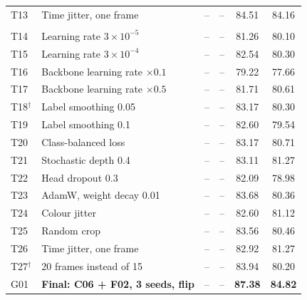 {\begin{longtable}{@{}llcccc@{}}
T13 & Time jitter, one frame & -- & -- & 84.51 & 84.16 \\
\addlinespace
\multicolumn{6}{@{}l}{\textit{Tuning F02, one change each}} \\
T14 & Learning rate $3\times10^{-5}$ & -- & -- & 81.26 & 80.10 \\
T15 & Learning rate $3\times10^{-4}$ & -- & -- & 82.54 & 80.30 \\
T16 & Backbone learning rate $\times0.1$ & -- & -- & 79.22 & 77.66 \\
T17 & Backbone learning rate $\times0.5$ & -- & -- & 81.71 & 80.61 \\
T18$^{\dagger}$ & Label smoothing 0.05 & -- & -- & 83.17 & 80.30 \\
T19 & Label smoothing 0.1 & -- & -- & 82.60 & 79.54 \\
T20 & Class-balanced loss & -- & -- & 83.17 & 80.71 \\
T21 & Stochastic depth 0.4 & -- & -- & 83.11 & 81.27 \\
T22 & Head dropout 0.3 & -- & -- & 82.09 & 78.98 \\
T23 & AdamW, weight decay 0.01 & -- & -- & 83.68 & 80.36 \\
T24 & Colour jitter & -- & -- & 82.60 & 81.12 \\
T25 & Random crop & -- & -- & 83.56 & 80.46 \\
T26 & Time jitter, one frame & -- & -- & 82.92 & 81.27 \\
T27$^{\dagger}$ & 20 frames instead of 15 & -- & -- & 83.94 & 80.20 \\
\addlinespace
\midrule
G01 & \textbf{Final: C06 + F02, 3 seeds, flip} & -- & -- & \textbf{87.38} & \textbf{84.82} \\
\end{longtable}
}
